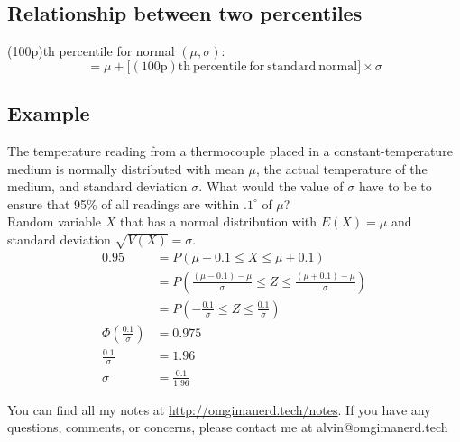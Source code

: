 \documentclass{math}
\begin{document}
\subsection*{Relationship between two percentiles}
(100p)th percentile for normal \( (\mu,\sigma) \):
\[ = \mu +\big[\mathrm{(100p)th\ percentile\ for\ standard\ normal}\big]
   \times\sigma \]

\subsection*{Example}
The temperature reading from a thermocouple placed in a constant-temperature
medium is normally distributed with mean \( \mu \), the actual temperature
of the medium, and standard deviation \( \sigma \). What would the value of
\( \sigma \) have to be to ensure that 95\% of all readings are within
\( .1^{\circ} \) of \( \mu \)? \\
Random variable \( X \) that has a normal distribution with \( E(X) = \mu \)
and standard deviation \( \sqrt{V(X)} = \sigma \).
\begin{align*}
  0.95 &= P(\mu-0.1\leq X\leq\mu+0.1) \\
  &= P(\frac{(\mu-0.1)-\mu}{\sigma}\leq Z\leq\frac{(\mu+0.1)-\mu}{\sigma}) \\
  &= P(-\frac{0.1}{\sigma}\leq Z\leq\frac{0.1}{\sigma}) \\
  \Phi(\frac{0.1}{\sigma}) &= 0.975 \\
  \frac{0.1}{\sigma} &= 1.96 \\
  \sigma &= \frac{0.1}{1.96}
\end{align*}

\begin{center}
  You can find all my notes at \url{http://omgimanerd.tech/notes}. If you have
  any questions, comments, or concerns, please contact me at
  alvin@omgimanerd.tech
\end{center}
\end{document}
